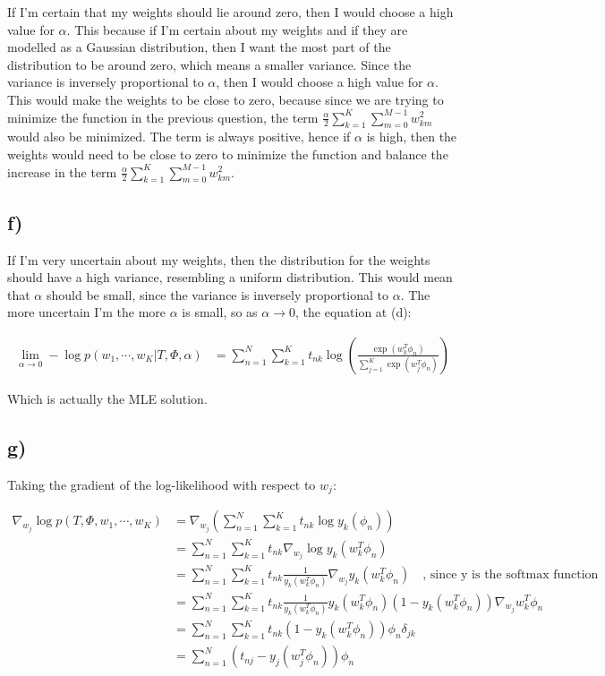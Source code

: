 \documentclass[12pt,a4paper,oneside]{paper}
\begin{document}
If I'm certain that my weights should lie around zero, then I would choose a high value for $\alpha$. This because
if I'm certain about my weights and if they are modelled as a Gaussian distribution, then I want the most part of the
distribution to be around zero, which means a smaller variance. Since the variance is inversely proportional to $\alpha$,
then I would choose a high value for $\alpha$. This would make the weights to be close to zero, because
since we are trying to minimize the function in the previous question, the term $\frac{\alpha}{2} \sum_{k=1}^{K} \sum_{m=0}^{M - 1} w_{km}^2$
would also be minimized. The term is always positive, hence if $\alpha$ is high, then the weights would need to be close to zero to minimize the function
and balance the increase in the term $\frac{\alpha}{2} \sum_{k=1}^{K} \sum_{m=0}^{M - 1} w_{km}^2$.

\subsection{f)}

If I'm very uncertain about my weights, then the distribution for the weights should have a high variance, 
resembling a uniform distribution. This would mean that $\alpha$ should be small, since the variance is inversely proportional to $\alpha$.
The more uncertain I'm the more $\alpha$ is small, so as $\alpha \rightarrow 0$, the equation at (d):

\begin{align*}
    \lim_{\alpha \rightarrow 0} -\log p(w_1, \cdots, w_K | T, \Phi, \alpha) &= \sum_{n=1}^{N} \sum_{k=1}^{K} t_{nk} \log \left(\frac{\exp(w_k^T \phi_n)}{\sum_{j=1}^{K} \exp(w_j^T \phi_n)}\right)
\end{align*}

Which is actually the MLE solution. 

\subsection{g)}

Taking the gradient of the log-likelihood with respect to $w_j$:

\begin{align*}
    \nabla_{w_j} \log p(T, \Phi, w_1, \cdots, w_K) &= \nabla_{w_j} \left(\sum_{n=1}^{N} \sum_{k=1}^{K} t_{nk} \log y_k(\phi_n)\right) \\
    &= \sum_{n=1}^{N} \sum_{k=1}^{K} t_{nk} \nabla_{w_j} \log y_k(w_k^T \phi_n) \\
    &= \sum_{n=1}^{N} \sum_{k=1}^{K} t_{nk} \frac{1}{y_k(w_k^T \phi_n)} \nabla_{w_j} y_k(w_k^T \phi_n) \quad \text{, since y is the softmax function} \\
    &= \sum_{n=1}^{N} \sum_{k=1}^{K} t_{nk} \frac{1}{y_k(w_k^T \phi_n)} y_k(w_k^T \phi_n) (1 - y_k(w_k^T \phi_n)) \nabla_{w_j} w_k^T \phi_n \\
    &= \sum_{n=1}^{N} \sum_{k=1}^{K} t_{nk} (1 - y_k(w_k^T \phi_n)) \phi_n \delta_{jk} \\
    &= \sum_{n=1}^{N} (t_{nj} - y_j(w_j^T \phi_n)) \phi_n
\end{align*}
\end{document}

